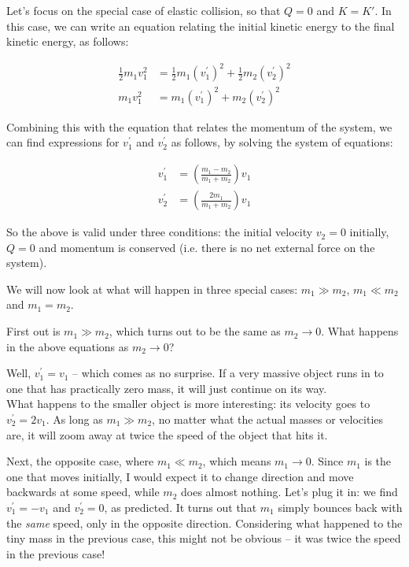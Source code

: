 \documentclass[12pt,a4paper]{report}
\begin{document}
Let's focus on the special case of elastic collision, so that $Q = 0$ and $K = K'$. In this case, we can write an equation relating the initial kinetic energy to the final kinetic energy, as follows:

\begin{align}
\frac{1}{2} m_1 v_1^2 &= \frac{1}{2} m_1 (v_1^{'})^2 + \frac{1}{2} m_2 (v_2^{'})^2\\
m_1 v_1^2 &= m_1 (v_1^{'})^2 + m_2 (v_2^{'})^2
\end{align}

Combining this with the equation that relates the momentum of the system, we can find expressions for $v_1^{'}$ and $v_2^{'}$ as follows, by solving the system of equations:

\begin{align}
v_1^{'} &= \left(\frac{m_1 - m_2}{m_1 + m_2}\right) v_1\\
v_2^{'} &= \left(\frac{2 m_1}{m_1 + m_2}\right) v_1
\end{align}

So the above is valid under three conditions: the initial velocity $v_2 = 0$ initially, $Q = 0$ and momentum is conserved (i.e. there is no net external force on the system).

We will now look at what will happen in three special cases: $m_1 \gg m_2$, $m_1 \ll m_2$ and $m_1 = m_2$.

First out is $m_1 \gg m_2$, which turns out to be the same as $m_2 \to 0$. What happens in the above equations as $m_2 \to 0$?

Well, $v_1^{'} = v_1$ -- which comes as no surprise. If a very massive object runs in to one that has practically zero mass, it will just continue on its way.\\
What happens to the smaller object is more interesting: its velocity goes to $v_2^{'} = 2 v_1$. As long as $m_1 \gg m_2$, no matter what the actual masses or velocities are, it will zoom away at twice the speed of the object that hits it.

Next, the opposite case, where $m_1 \ll m_2$, which means $m_1 \to 0$. Since $m_1$ is the one that moves initially, I would expect it to change direction and move backwards at some speed, while $m_2$ does almost nothing. Let's plug it in: we find $v_1^{'} = -v_1$ and $v_2^{'} = 0$, as predicted. It turns out that $m_1$ simply bounces back with the \emph{same} speed, only in the opposite direction. Considering what happened to the tiny mass in the previous case, this might not be obvious -- it was twice the speed in the previous case!
\end{document}
